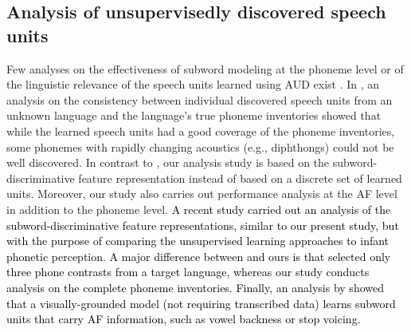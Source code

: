 \documentclass[transmag]{IEEEtran}
\begin{document}


\subsection{Analysis of unsupervisedly discovered speech units}
Few analyses on the effectiveness of subword modeling at the phoneme level or of the linguistic relevance of the speech units learned using AUD exist \cite{feng2017linguistic,harwath2019towards,matusevych2020evaluating}. 
In \cite{feng2017linguistic}, an analysis on the consistency between individual discovered speech units from an unknown language and the language’s true phoneme inventories showed that while the learned speech units had a good coverage of the phoneme inventories, some phonemes with rapidly changing acoustics (e.g., diphthongs) could not be well discovered. In contrast to  \cite{feng2017linguistic},  our analysis study is based on the subword-discriminative feature representation instead of based on a discrete set of learned units. Moreover, our study also carries out performance analysis at the AF level in addition to the phoneme level. %
\textcolor{black}{A recent study \cite{matusevych2020evaluating} carried out an  analysis of the subword-discriminative feature representations, similar to our present study,  but with the purpose of comparing the unsupervised learning approaches to infant phonetic perception. A major difference between \cite{matusevych2020evaluating} and ours is that \cite{matusevych2020evaluating} selected only three phone contrasts from a target language, whereas our study conducts analysis on the complete phoneme inventories.
Finally, an analysis by \cite{harwath2019towards} showed that  a visually-grounded model (not requiring transcribed data) learns  subword units that carry AF information, such as  vowel backness or stop voicing. }

\end{document}
